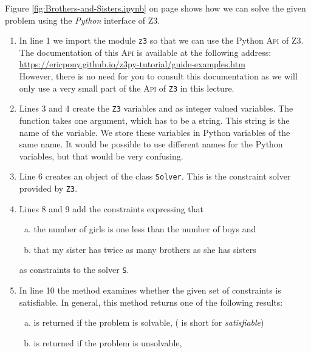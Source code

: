 \noindent
Figure \ref{fig:Brothers-and-Sisters.ipynb} on page \pageref{fig:Brothers-and-Sisters.ipynb} shows how we can
solve the given problem using the \textsl{Python}
interface of Z3.
\begin{enumerate}
\item In line 1 we import the module \texttt{z3} so that we can use the Python \textsc{Api} of Z3.
      The documentation of this \textsc{Api} is available at the following address:
      \\[0.2cm]
      \hspace*{1.3cm}
      \href{https://ericpony.github.io/z3py-tutorial/guide-examples.htm}{https://ericpony.github.io/z3py-tutorial/guide-examples.htm}
      \\[0.2cm]
      However, there is no need for you to consult this documentation as we will only use a very small part of
      the \textsc{Api} of \texttt{Z3} in this lecture. 
\item Lines 3 and 4 create the \texttt{Z3} variables  and  as integer valued variables.
      The function  takes one argument, which has to be a string.  This string is the name of the
      variable.  We store these variables in Python variables of the same name.  It would be possible to use
      different names for the Python variables, but that would be very confusing.
\item Line 6 creates an object of the class \texttt{Solver}.  This is the constraint solver provided by
      \texttt{Z3}.
    \item Lines 8 and 9 add the constraints expressing that
      \begin{enumerate}[(a)]
      \item the number of girls is one less than the number of boys \quad and 
      \item that my sister has twice as many brothers as she has sisters 
      \end{enumerate}
      as constraints to the solver \texttt{S}.
\item In line 10 the method  examines whether the given set of constraints is satisfiable.
      In general, this method returns one of the following results:
      \begin{enumerate}[(a)]
      \item {} is returned if the problem is solvable, ( is short for \emph{satisfiable})
      \item {} is returned if the problem is unsolvable,

\end{enumerate}
\end{enumerate}
